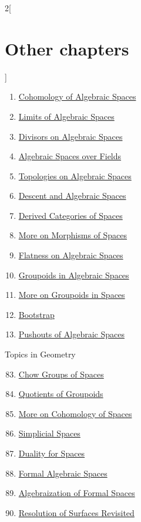\begin{multicols}{2}[\section{Other chapters}]
\begin{enumerate}
\item \hyperref[spaces-cohomology-section-phantom]{Cohomology of Algebraic Spaces}
\item \hyperref[spaces-limits-section-phantom]{Limits of Algebraic Spaces}
\item \hyperref[spaces-divisors-section-phantom]{Divisors on Algebraic Spaces}
\item \hyperref[spaces-over-fields-section-phantom]{Algebraic Spaces over Fields}
\item \hyperref[spaces-topologies-section-phantom]{Topologies on Algebraic Spaces}
\item \hyperref[spaces-descent-section-phantom]{Descent and Algebraic Spaces}
\item \hyperref[spaces-perfect-section-phantom]{Derived Categories of Spaces}
\item \hyperref[spaces-more-morphisms-section-phantom]{More on Morphisms of Spaces}
\item \hyperref[spaces-flat-section-phantom]{Flatness on Algebraic Spaces}
\item \hyperref[spaces-groupoids-section-phantom]{Groupoids in Algebraic Spaces}
\item \hyperref[spaces-more-groupoids-section-phantom]{More on Groupoids in Spaces}
\item \hyperref[bootstrap-section-phantom]{Bootstrap}
\item \hyperref[spaces-pushouts-section-phantom]{Pushouts of Algebraic Spaces}
\end{enumerate}
Topics in Geometry
\begin{enumerate}
\setcounter{enumi}{82}
\item \hyperref[spaces-chow-section-phantom]{Chow Groups of Spaces}
\item \hyperref[groupoids-quotients-section-phantom]{Quotients of Groupoids}
\item \hyperref[spaces-more-cohomology-section-phantom]{More on Cohomology of Spaces}
\item \hyperref[spaces-simplicial-section-phantom]{Simplicial Spaces}
\item \hyperref[spaces-duality-section-phantom]{Duality for Spaces}
\item \hyperref[formal-spaces-section-phantom]{Formal Algebraic Spaces}
\item \hyperref[restricted-section-phantom]{Algebraization of Formal Spaces}
\item \hyperref[spaces-resolve-section-phantom]{Resolution of Surfaces Revisited}

\end{enumerate}
\end{multicols}
